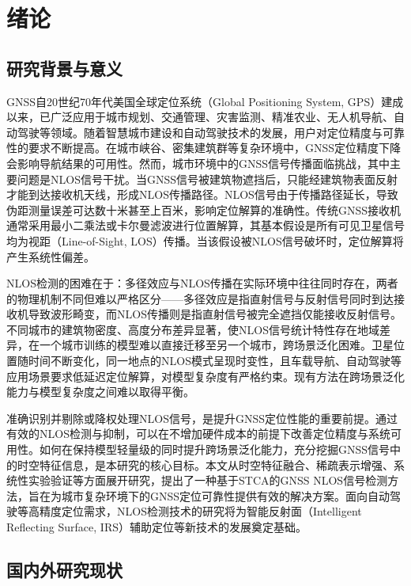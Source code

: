 \chapter{绪论}

\section{研究背景与意义}

    GNSS自20世纪70年代美国全球定位系统（Global Positioning System, GPS）建成以来，已广泛应用于城市规划、交通管理、灾害监测、精准农业、无人机导航、自动驾驶等领域\cite{janssen2023survey}。随着智慧城市建设和自动驾驶技术的发展，用户对定位精度与可靠性的要求不断提高\cite{zhu2024irs, mohanty2024survey}。在城市峡谷、密集建筑群等复杂环境中，GNSS定位精度下降会影响导航结果的可用性。然而，城市环境中的GNSS信号传播面临挑战，其中主要问题是NLOS信号干扰。当GNSS信号被建筑物遮挡后，只能经建筑物表面反射才能到达接收机天线，形成NLOS传播路径。NLOS信号由于传播路径延长，导致伪距测量误差可达数十米甚至上百米，影响定位解算的准确性。传统GNSS接收机通常采用最小二乘法或卡尔曼滤波进行位置解算，其基本假设是所有可见卫星信号均为视距（Line-of-Sight, LOS）传播。当该假设被NLOS信号破坏时，定位解算将产生系统性偏差。

    NLOS检测的困难在于：多径效应与NLOS传播在实际环境中往往同时存在，两者的物理机制不同但难以严格区分——多径效应是指直射信号与反射信号同时到达接收机导致波形畸变，而NLOS传播则是指直射信号被完全遮挡仅能接收反射信号。不同城市的建筑物密度、高度分布差异显著，使NLOS信号统计特性存在地域差异，在一个城市训练的模型难以直接迁移至另一个城市，跨场景泛化困难。卫星位置随时间不断变化，同一地点的NLOS模式呈现时变性，且车载导航、自动驾驶等应用场景要求低延迟定位解算，对模型复杂度有严格约束。现有方法在跨场景泛化能力与模型复杂度之间难以取得平衡。

    准确识别并剔除或降权处理NLOS信号，是提升GNSS定位性能的重要前提。通过有效的NLOS检测与抑制，可以在不增加硬件成本的前提下改善定位精度与系统可用性。如何在保持模型轻量级的同时提升跨场景泛化能力，充分挖掘GNSS信号中的时空特征信息，是本研究的核心目标。本文从时空特征融合、稀疏表示增强、系统性实验验证等方面展开研究，提出了一种基于STCA的GNSS NLOS信号检测方法，旨在为城市复杂环境下的GNSS定位可靠性提供有效的解决方案。面向自动驾驶等高精度定位需求，NLOS检测技术的研究将为智能反射面（Intelligent Reflecting Surface, IRS）辅助定位等新技术的发展奠定基础\cite{zhu2024irs}。

\section{国内外研究现状}

